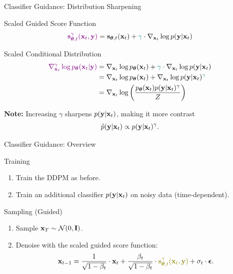 \documentclass{beamer}
\renewcommand{\eqpause}{}
\renewcommand{\nextonslide}[1]{#1}
\begin{document}
\begin{frame}{Classifier Guidance: Distribution Sharpening}
	\begin{block}{Scaled Guided Score Function}
		\[
			{\color{violet}\mathbf{s}^{\gamma}_{\boldsymbol{\theta}, t}(\mathbf{x}_t, \mathbf{y})} = \mathbf{s}_{\boldsymbol{\theta}, t}(\mathbf{x}_t)+ {\color{teal}\gamma} \cdot \nabla_{\mathbf{x}_t} \log p(\mathbf{y} | \mathbf{x}_t)
		\]
		\vspace{-0.5cm}
	\end{block}
	\eqpause
	\begin{block}{Scaled Conditional Distribution}
		\vspace{-0.5cm}
		\begin{align*}
			{\color{violet}\nabla_{\bx_t}^{\gamma} \log \pt(\bx_t | \by)} 
			&= \nabla_{\bx_t} \log \pt(\bx_t) + {\color{teal}\gamma}  \cdot \nabla_{\bx_t} \log p(\by | \bx_t) \\
			\nextonslide{
			&= \nabla_{\bx_t} \log \pt(\bx_t) + \nabla_{\bx_t} \log p(\by | \bx_t)^{\color{teal}\gamma} \\
			}
			\nextonslide{
			&= \nabla_{\bx_t} \log \left( \frac{\pt(\bx_t) p(\by | \bx_t)^{\gamma}}{Z} \right)
			}
		\end{align*}
		\vspace{-0.3cm}
	\end{block}
	\eqpause
	\textbf{Note:} Increasing $\gamma$ sharpens $p(\mathbf{y} | \mathbf{x}_t)$, making it more contrast
	\[
		\hat{p}(\mathbf{y} | \mathbf{x}_t) \propto p(\mathbf{y} | \mathbf{x}_t)^{\gamma}.
	\]
\end{frame}
\begin{frame}{Classifier Guidance: Overview}

	\begin{block}{Training}
		\begin{enumerate}
			\item Train the DDPM as before.
			\item Train an additional classifier $p(\mathbf{y} | \mathbf{x}_t)$ on noisy data (time-dependent).
		\end{enumerate}
		\vspace{-0.2cm}
	\end{block}
	\eqpause
	\begin{block}{Sampling (Guided)}
		\begin{enumerate}
			\item Sample $\mathbf{x}_T \sim \mathcal{N}(0, \mathbf{I})$.
			\item Denoise with the scaled guided score function:
			\vspace{-0.3cm}
			\[
				\bx_{t-1} = \frac{1}{\sqrt{1 - \beta_t}} \cdot \bx_t + \frac{\beta_t}{\sqrt{1 - \beta_t}} \cdot  {\color{olive}\bs^{\gamma}_{\btheta, t}(\bx_t, \by)} + \sigma_t \cdot \bepsilon.
			\]
		\end{enumerate}
	\end{block}
\end{frame}
\end{document}

